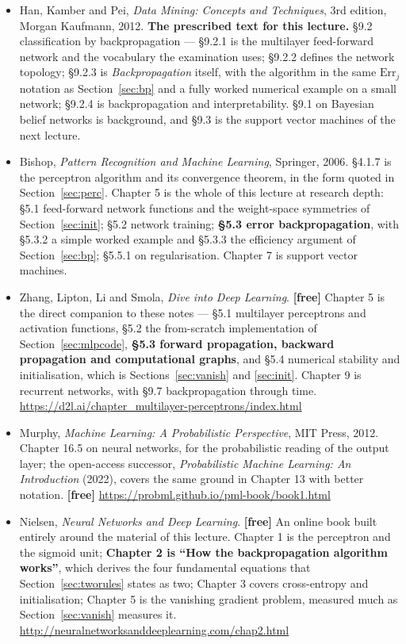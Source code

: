 \documentclass[11pt]{article}
\begin{document}
\begin{itemize}[leftmargin=*]
  \item Han, Kamber and Pei, \emph{Data Mining: Concepts and Techniques}, 3rd
    edition, Morgan Kaufmann, 2012. \textbf{The prescribed text for this
    lecture.} \S9.2 classification by backpropagation --- \S9.2.1 is the
    multilayer feed-forward network and the vocabulary the examination uses;
    \S9.2.2 defines the network topology; \S9.2.3 is \emph{Backpropagation}
    itself, with the algorithm in the same $\mathrm{Err}_j$ notation as
    Section~\ref{sec:bp} and a fully worked numerical example on a small
    network; \S9.2.4 is backpropagation and interpretability. \S9.1 on
    Bayesian belief networks is background, and \S9.3 is the support vector
    machines of the next lecture.
  \item Bishop, \emph{Pattern Recognition and Machine Learning}, Springer,
    2006. \S4.1.7 is the perceptron algorithm and its convergence theorem, in
    the form quoted in Section~\ref{sec:perc}. Chapter 5 is the whole of this
    lecture at research depth: \S5.1 feed-forward network functions and the
    weight-space symmetries of Section~\ref{sec:init}; \S5.2 network training;
    \textbf{\S5.3 error backpropagation}, with \S5.3.2 a simple worked example
    and \S5.3.3 the efficiency argument of Section~\ref{sec:bp}; \S5.5.1 on
    regularisation. Chapter 7 is support vector machines.
  \item Zhang, Lipton, Li and Smola, \emph{Dive into Deep Learning}.
    \textbf{[free]} Chapter 5 is the direct companion to these notes ---
    \S5.1 multilayer perceptrons and activation functions, \S5.2 the
    from-scratch implementation of Section~\ref{sec:mlpcode}, \textbf{\S5.3
    forward propagation, backward propagation and computational graphs}, and
    \S5.4 numerical stability and initialisation, which is
    Sections~\ref{sec:vanish} and \ref{sec:init}. Chapter 9 is recurrent
    networks, with \S9.7 backpropagation through time.
    \url{https://d2l.ai/chapter_multilayer-perceptrons/index.html}
  \item Murphy, \emph{Machine Learning: A Probabilistic Perspective}, MIT
    Press, 2012. Chapter 16.5 on neural networks, for the probabilistic
    reading of the output layer; the open-access successor,
    \emph{Probabilistic Machine Learning: An Introduction} (2022), covers the
    same ground in Chapter 13 with better notation. \textbf{[free]}
    \url{https://probml.github.io/pml-book/book1.html}
  \item Nielsen, \emph{Neural Networks and Deep Learning}. \textbf{[free]}
    An online book built entirely around the material of this lecture.
    Chapter 1 is the perceptron and the sigmoid unit; \textbf{Chapter 2 is
    ``How the backpropagation algorithm works''}, which derives the four
    fundamental equations that Section~\ref{sec:tworules} states as two;
    Chapter 3 covers cross-entropy and initialisation; Chapter 5 is the
    vanishing gradient problem, measured much as Section~\ref{sec:vanish}
    measures it. \url{http://neuralnetworksanddeeplearning.com/chap2.html}
\end{itemize}
\end{document}
